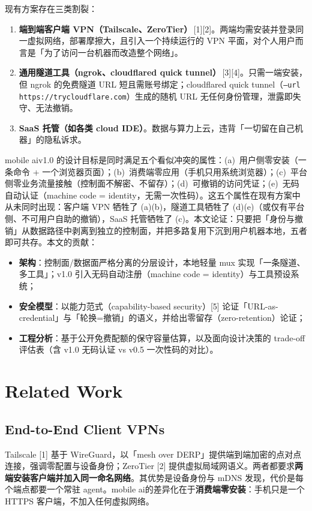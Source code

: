\documentclass[10pt,a4paper]{article}
\newcommand{\sys}{mobile ai}
\begin{document}
现有方案存在三类割裂：
\begin{enumerate}[leftmargin=1.6em,itemsep=0.2em,topsep=0.2em]
  \item \textbf{端到端客户端 VPN（Tailscale、ZeroTier）}\,[1][2]。两端均需安装并登录同一虚拟网络，部署摩擦大，且引入一个持续运行的 VPN 平面，对个人用户而言是「为了访问一台机器而改造整个网络」。
  \item \textbf{通用隧道工具（ngrok、cloudflared quick tunnel）}\,[3][4]。只需一端安装，但 ngrok 的免费隧道 URL 短且需账号绑定；cloudflared quick tunnel（\texttt{--url https://trycloudflare.com}）生成的随机 URL 无任何身份管理，泄露即失守、无法撤销。
  \item \textbf{SaaS 托管（如各类 cloud IDE）}。数据与算力上云，违背「一切留在自己机器」的隐私诉求。
\end{enumerate}

\sys v1.0 的设计目标是同时满足五个看似冲突的属性：(a)~用户侧零安装（一条命令 + 一个浏览器页面）；(b)~消费端零应用（手机只用系统浏览器）；(c)~平台侧零业务流量接触（控制面不解密、不留存）；(d)~可撤销的访问凭证；(e)~无码自动认证（machine code = identity，无需一次性码）。这五个属性在现有方案中从未同时出现：客户端 VPN 牺牲了 (a)(b)，隧道工具牺牲了 (d)(e)（或仅有平台侧、不可用户自助的撤销），SaaS 托管牺牲了 (c)。本文论证：只要把「身份与撤销」从数据路径中剥离到独立的控制面，并把多路复用下沉到用户机器本地，五者即可共存。本文的贡献：
\begin{itemize}[leftmargin=1.6em,itemsep=0.2em,topsep=0.2em]
  \item \textbf{架构}：控制面/数据面严格分离的分层设计，本地轻量 mux 实现「一条隧道、多工具」；v1.0 引入无码自动注册（machine code = identity）与工具预设系统；
  \item \textbf{安全模型}：以能力范式（capability-based security）[5] 论证「URL-as-credential」与「轮换=撤销」的语义，并给出零留存（zero-retention）论证；
  \item \textbf{工程分析}：基于公开免费配额的保守容量估算，以及面向设计决策的 trade-off 评估表（含 v1.0 无码认证 vs v0.5 一次性码的对比）。
\end{itemize}

\section{Related Work}

\subsection{End-to-End Client VPNs}
Tailscale [1] 基于 WireGuard，以「mesh over DERP」提供端到端加密的点对点连接，强调零配置与设备身份；ZeroTier [2] 提供虚拟局域网语义。两者都要求\textbf{两端安装客户端并加入同一命名网络}。其优势是设备身份与 mDNS 发现，代价是每个端点都要一个常驻 agent。\sys 的差异化在于\textbf{消费端零安装}：手机只是一个 HTTPS 客户端，不加入任何虚拟网络。
\end{document}
